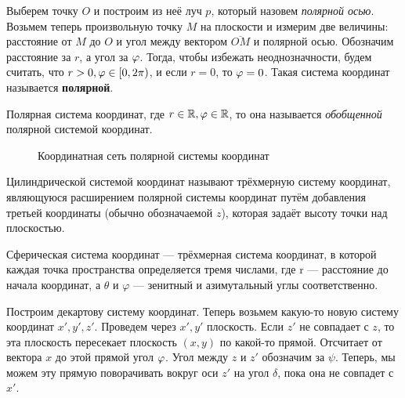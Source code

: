 	\Pagebreak

	\begin{Def}
		Выберем точку $O$ и построим из неё луч $p$, который назовем \textit{полярной осью}. Возьмем теперь произвольную точку $M$ на плоскости и измерим две величины:
		расстояние от $M$ до $O$ и угол между вектором $\overline{OM}$ и полярной осью. Обозначим расстояние за $r$, а угол за $\varphi$.
		Тогда, чтобы избежать неоднозначности, будем считать, что $r > 0, \varphi \in [0, 2\pi)$, и если $r = 0$, то $\varphi = 0$.    
		Такая система координат называется \textbf{полярной}.		

	\end{Def}

	\begin{figure}[h]
		\centering
		\def\svgwidth{0.3\columnwidth}
		
	\end{figure}

	\begin{Def}
		Полярная система координат, где $r \in \mathbb{R}, \varphi \in \mathbb{R}$, то она называется \textit{обобщенной} полярной системой координат.
	\end{Def}

	\begin{figure}[h!]
		\centering
		\def\svgwidth{0.3\columnwidth}
		
		\caption{Координатная сеть полярной системы координат}
	\end{figure}

	\begin{Def}
		Цилиндрической системой координат называют трёхмерную систему координат, являющуюся расширением полярной системы координат путём добавления третьей координаты (обычно обозначаемой ${\displaystyle z}$), которая задаёт высоту точки над плоскостью.
	\end{Def}

	\begin{Def}
		Сферическая система координат — трёхмерная система координат, в которой каждая точка пространства определяется тремя числами, где r — расстояние до начала координат, а $\theta$ и $\varphi$ — зенитный и азимутальный углы соответственно.
	\end{Def}


	Построим декартову систему координат. Теперь возьмем какую-то новую систему координат $x', y', z'$.
	Проведем через $x', y'$ плоскость. Если $z'$ не совпадает с $z$, то эта плоскость пересекает плоскость $(x, y)$ по какой-то прямой.
	Отсчитает от вектора $x$ до этой прямой угол $\varphi$. Угол между $z$ и $z'$ обозначим за $\psi$.
	Теперь, мы можем эту прямую поворачивать вокруг оси $z'$ на угол $\delta$, пока она не совпадет с $x'$.
	
